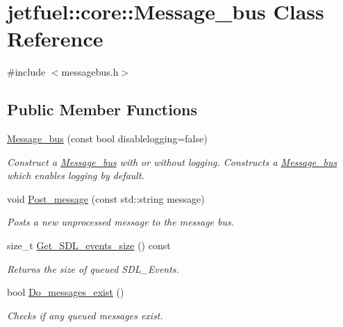 \hypertarget{classjetfuel_1_1core_1_1Message__bus}{}\section{jetfuel\+:\+:core\+:\+:Message\+\_\+bus Class Reference}
\label{classjetfuel_1_1core_1_1Message__bus}


{\ttfamily \#include $<$messagebus.\+h$>$}

\subsection*{Public Member Functions}
\begin{DoxyCompactItemize}
\item 
\hyperlink{classjetfuel_1_1core_1_1Message__bus_abf8b94890bd7223f9fa3f7d861ee96ab}{Message\+\_\+bus} (const bool disablelogging=false)
\begin{DoxyCompactList}\small\item\em Construct a \hyperlink{classjetfuel_1_1core_1_1Message__bus}{Message\+\_\+bus} with or without logging. Constructs a \hyperlink{classjetfuel_1_1core_1_1Message__bus}{Message\+\_\+bus} which enables logging by default. \end{DoxyCompactList}\item 
void \hyperlink{classjetfuel_1_1core_1_1Message__bus_a7a36c1ebc19327ddb554d6f8199a6965}{Post\+\_\+message} (const std\+::string message)
\begin{DoxyCompactList}\small\item\em Posts a new unprocessed message to the message bus. \end{DoxyCompactList}\item 
size\+\_\+t \hyperlink{classjetfuel_1_1core_1_1Message__bus_aa363b50d4ba99ae86430b5f12610fd39}{Get\+\_\+\+S\+D\+L\+\_\+events\+\_\+size} () const
\begin{DoxyCompactList}\small\item\em Returns the size of queued S\+D\+L\+\_\+\+Events. \end{DoxyCompactList}\item 
bool \hyperlink{classjetfuel_1_1core_1_1Message__bus_a81015af8f393e028c4e9e670167aa013}{Do\+\_\+messages\+\_\+exist} ()
\begin{DoxyCompactList}\small\item\em Checks if any queued messages exist. \end{DoxyCompactList}\item 

\end{DoxyCompactItemize}

